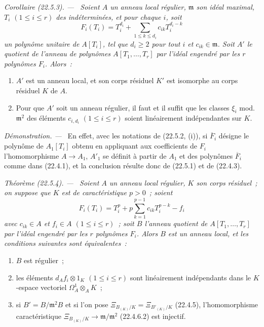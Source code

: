 \documentclass[10pt,oneside]{book}
\makeatletter
\newcommand{\setmanualcurrentlabel}[1]{\def\@currentlabel{#1}}
\newenvironment{theorem}[1][]{%
  \setmanualcurrentlabel{#1}\par\medskip\noindent\itshape Théorème (#1). ---\ }{\par}
\newenvironment{corollary}[1][]{%
  \setmanualcurrentlabel{#1}\par\medskip\noindent\itshape Corollaire (#1). ---\ }{\par}
\newenvironment{proof}{%
  \par\medskip\noindent\textit{Démonstration. ---\ }}{\par}
\makeatother
\begin{document}
\begin{corollary}[22.5.3]
\label{0.22.5.3-fr}
Soient $A$ un anneau local régulier, $\mathfrak m$ son idéal maximal,
$T_i$ $(1\leqslant i\leqslant r)$ des indéterminées, et pour chaque $i$, soit
\begin{equation}
\label{0.22.5.3.1-fr}
  F_i(T_i)=T_i^{d_i}+\sum_{1\leqslant k\leqslant d_i}c_{ik}T_i^{d_i-k}
  \tag{22.5.3.1}
\end{equation}
un polynôme unitaire de $A[T_i]$, tel que $d_i\geqslant2$ pour tout $i$ et
$c_{ik}\in\mathfrak m$. Soit $A'$ le quotient de l'anneau de polynômes
$A[T_1,\ldots,T_r]$ par l'idéal engendré par les $r$ polynômes $F_i$. Alors~:
\begin{enumerate}
  \item[\rm(i)] $A'$ est un anneau local, et son corps résiduel $K'$ est
  isomorphe au corps résiduel $K$ de $A$.
  \item[\rm(ii)] Pour que $A'$ soit un anneau régulier, il faut et il suffit
  que les classes $\xi_i$ mod.~$\mathfrak m^2$ des éléments $c_{i,d_i}$
  $(1\leqslant i\leqslant r)$ soient linéairement indépendantes sur $K$.
\end{enumerate}
\end{corollary}

\begin{proof}
En effet, avec les notations de (22.5.2, (i)), si $\overline F_i$ désigne le
polynôme de $A_1[T_i]$ obtenu en appliquant aux coefficients de $F_i$
l'homomorphisme $A\longrightarrow A_1$, $A'_1$ se définit à partir de $A_1$ et
des polynômes $\overline F_i$ comme dans (22.4.1), et la conclusion résulte
donc de (22.5.1) et de (22.4.3).
\end{proof}

\begin{theorem}[22.5.4]
\label{0.22.5.4-fr}
Soient $A$ un anneau local régulier, $K$ son corps résiduel~; on suppose que
$K$ est de caractéristique $p>0$~; soient
\begin{equation}
\label{0.22.5.4.1-fr}
  F_i(T_i)=T_i^p+p\sum_{k=1}^{p-1}c_{ik}T_i^{p-k}-f_i
  \tag{22.5.4.1}
\end{equation}
avec $c_{ik}\in A$ et $f_i\in A$ $(1\leqslant i\leqslant r)$~; soit $B$
l'anneau quotient de $A[T_1,\ldots,T_r]$ par l'idéal engendré par les $r$
polynômes $F_i$. Alors $B$ est un anneau local, et les conditions suivantes
sont équivalentes~:
\begin{enumerate}
  \item[a)] $B$ est régulier~;
  \item[b)] les éléments $d_Af_i\otimes1_K$ $(1\leqslant i\leqslant r)$ sont
  linéairement indépendants dans le $K$-espace vectoriel
  $\Omega^1_A\otimes_AK$~;
  \item[c)] si $B'=B/\mathfrak m^2B$ et si l'on pose
  $\Xi_{B_{(K)}/K}=\Xi_{B'_{(K)}/K}$ (22.4.5), l'homomorphisme
  caractéristique $\Xi_{B_{(K)}/K}\longrightarrow\mathfrak m/\mathfrak m^2$
  (22.4.6.2) est injectif.
\end{enumerate}
\end{theorem}
\end{document}
